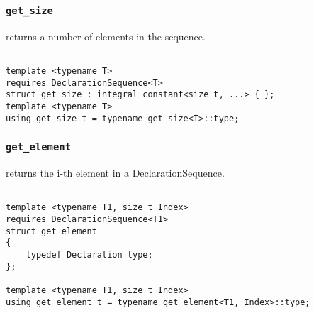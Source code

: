 
\subsubsection{\texttt{get\_size}}

returns a number of elements in the sequence.

\begin{verbatim}

template <typename T>
requires DeclarationSequence<T>
struct get_size : integral_constant<size_t, ...> { };
template <typename T>
using get_size_t = typename get_size<T>::type;

\end{verbatim}

\subsubsection{\texttt{get\_element}}

returns the i-th element in a DeclarationSequence.

\begin{verbatim}

template <typename T1, size_t Index>
requires DeclarationSequence<T1>
struct get_element
{
	typedef Declaration type;
};
	
template <typename T1, size_t Index>
using get_element_t = typename get_element<T1, Index>::type;

\end{verbatim}
